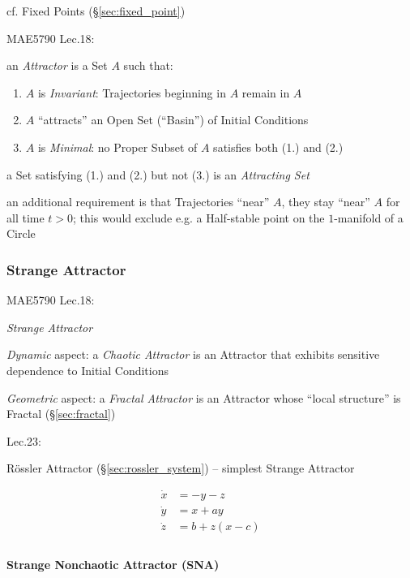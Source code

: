 cf. Fixed Points (\S\ref{sec:fixed_point})

MAE5790 Lec.18:

an \emph{Attractor} is a Set $A$ such that:
\begin{enumerate}
  \item $A$ is \emph{Invariant}: Trajectories beginning in $A$ remain in $A$
  \item $A$ ``attracts'' an Open Set (``Basin'') of Initial Conditions
  \item $A$ is \emph{Minimal}: no Proper Subset of $A$ satisfies both (1.) and
    (2.)
\end{enumerate}

a Set satisfying (1.) and (2.) but not (3.) is an \emph{Attracting Set}

an additional requirement is that Trajectories ``near'' $A$, they stay ``near''
$A$ for all time $t > 0$; this would exclude e.g. a Half-stable point on the
$1$-manifold of a Circle



\subsubsection{Strange Attractor}\label{sec:strange_attractor}

MAE5790 Lec.18:

\emph{Strange Attractor}

\emph{Dynamic} aspect: a \emph{Chaotic Attractor} is an Attractor that exhibits
sensitive dependence to Initial Conditions

\emph{Geometric} aspect: a \emph{Fractal Attractor} is an Attractor whose
``local structure'' is Fractal (\S\ref{sec:fractal})

Lec.23:

R\"ossler Attractor (\S\ref{sec:rossler_system}) -- simplest Strange Attractor

\begin{align*}
  \dot{x} &= -y-z \\
  \dot{y} &= x + ay \\
  \dot{z} &= b + z(x - c) \\
\end{align*}



\paragraph{Strange Nonchaotic Attractor (SNA)}\label{sec:sna}\hfill

